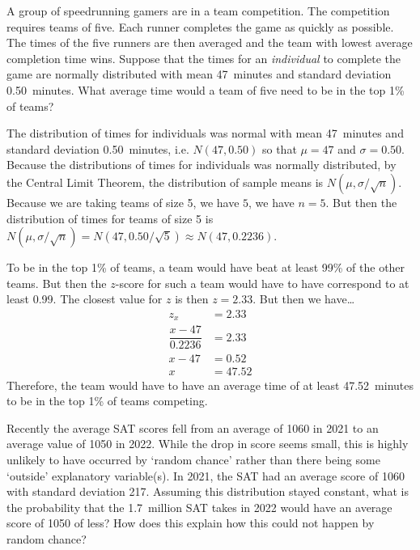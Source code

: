 \documentclass[11pt,letterpaper]{article}
\begin{document}
 A group of speedrunning gamers are in a team competition. The competition requires teams of five. Each runner completes the game as quickly as possible. The times of the five runners are then averaged and the team with lowest average completion time wins. Suppose that the times for an \textit{individual} to complete the game are normally distributed with mean 47~minutes and standard deviation 0.50~minutes. What average time would a team of five need to be in the top 1\% of teams? \pspace

\sol The distribution of times for individuals was normal with mean 47~minutes and standard deviation 0.50~minutes, i.e. $N(47, 0.50)$ so that $\mu= 47$ and $\sigma= 0.50$. Because the distributions of times for individuals was normally distributed, by the Central Limit Theorem, the distribution of sample means is $N(\mu, \sigma/\sqrt{n})$. Because we are taking teams of size 5, we have $5$, we have $n= 5$. But then the distribution of times for teams of size 5 is $N(\mu, \sigma/\sqrt{n})= N(47, 0.50/\sqrt{5}) \approx N(47, 0.2236)$. \pspace

To be in the top 1\% of teams, a team would have beat at least 99\% of the other teams. But then the $z$-score for such a team would have to have correspond to at least 0.99. The closest value for $z$ is then $z= 2.33$. But then we have\dots
	\[
	\begin{aligned}
	z_x&= 2.33 \\
	\dfrac{x - 47}{0.2236}&= 2.33 \\
	x - 47&= 0.52 \\
	x&= 47.52
	\end{aligned}
	\]
Therefore, the team would have to have an average time of at least 47.52~minutes to be in the top 1\% of teams competing. 



\newpage


 Recently the average SAT scores fell from an average of 1060 in 2021 to an average value of 1050 in 2022. While the drop in score seems small, this is highly unlikely to have occurred by `random chance' rather than there being some `outside' explanatory variable(s). In 2021, the SAT had an average score of 1060 with standard deviation 217. Assuming this distribution stayed constant, what is the probability that the 1.7~million SAT takes in 2022 would have an average score of 1050 of less? How does this explain how this could not happen by random chance? \pspace
\end{document}
